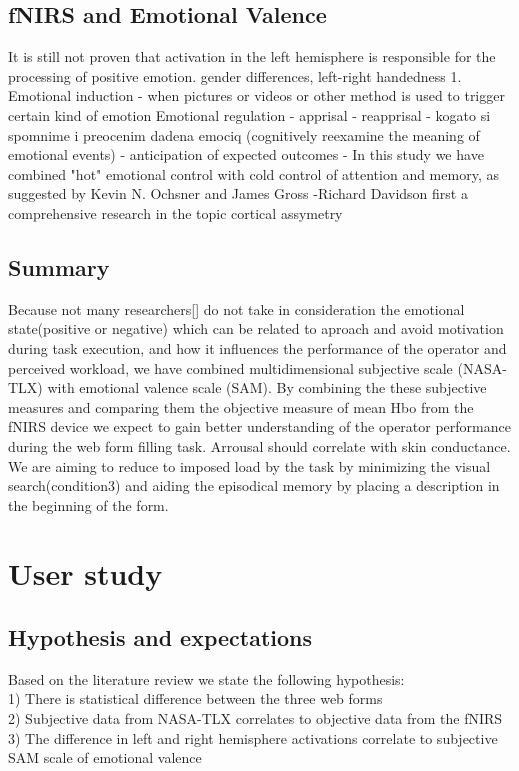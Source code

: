 \documentclass[a4paper]{report}
\begin{document}
			
	\section{fNIRS and Emotional Valence}
		It is still not proven that activation in the left hemisphere is responsible for the processing of positive emotion.
		gender differences, 
		left-right handedness
		1. Emotional induction - when pictures or videos or other method is used to trigger certain kind of emotion
		Emotional regulation
		- apprisal
		- reapprisal - kogato si spomnime i preocenim dadena emociq (cognitively reexamine the meaning of emotional events)
		- anticipation of expected outcomes 
		- In this study we have combined "hot" emotional control  with cold control of attention and memory, as suggested by Kevin N. Ochsner and James Gross \cite{the-cognitive-control-of-emotion}
		-Richard Davidson first a comprehensive research in the topic cortical assymetry
	\section{Summary}
		Because not many researchers[] do not take in consideration the emotional state(positive or negative) which can be related to aproach and avoid motivation during task execution, and how it influences the performance of the operator and perceived workload, we have combined multidimensional subjective scale (NASA-TLX) with emotional valence scale (SAM). By combining the these subjective measures and comparing them the objective measure of mean Hbo from the fNIRS device we expect to gain better understanding of the operator performance during the web form filling task.
		Arrousal should correlate with skin conductance.
		We are aiming to reduce to imposed load by the task by minimizing the visual search(condition3) and aiding the episodical memory by placing a description in the beginning of the form.
\chapter{User study}
	\section{Hypothesis and expectations}
	Based on the literature review we state the following hypothesis:\\
	1) There is statistical difference between the three web forms\\
	2) Subjective data from NASA-TLX correlates to objective data from the fNIRS\\
	3) The difference in left and right hemisphere activations correlate to subjective SAM scale of emotional valence\\	
\end{document}
